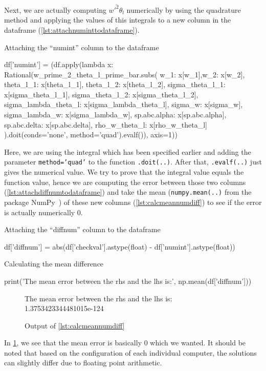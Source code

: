 Next, we are actually computing $\overline{w'^2\theta_l}$ numerically by using the quadrature method
and applying the values of this integrals
to a new column in the dataframe (\cref{lst:attachnuminttodataframe}).
\begin{listing}[!ht]
    \caption{Attaching the \enquote{numint} column to the dataframe}
    \label{lst:attachnuminttodataframe}
    \begin{pythoncode}
        df['numint'] = (df.apply(lambda x: Rational(w_prime_2_theta_l_prime_bar.subs({
            w_1: x[w_1],w_2: x[w_2], theta_l_1: x[theta_l_1], theta_l_2: x[theta_l_2],
            sigma_theta_l_1: x[sigma_theta_l_1], sigma_theta_l_2: x[sigma_theta_l_2],
            sigma_lambda_theta_l: x[sigma_lambda_theta_l], sigma_w: x[sigma_w],
            sigma_lambda_w: x[sigma_lambda_w], sp.abc.alpha: x[sp.abc.alpha],
            sp.abc.delta: x[sp.abc.delta], rho_w_theta_l: x[rho_w_theta_l]
        }).doit(conds='none', method='quad').evalf()), axis=1))
    \end{pythoncode}
\end{listing}
Here, we are using the integral which has been specified earlier
and adding the parameter \texttt{method='quad'}
to the function \texttt{.doit(..)}.
After that, \texttt{.evalf(..)} just gives the numerical value.
We try to prove that the integral value equals the function value,
hence we are computing the error between those two columns (\cref{lst:attachdiffnumtodataframe})
and take the mean (\texttt{numpy.mean(..)} from the package NumPy~\autocite{harris2020array})
of these new columns (\cref{lst:calcmeannumdiff}) to see if the error is actually numerically 0.
\begin{listing}[!ht]
    \caption{Attaching the \enquote{diffnum} column to the dataframe}
    \label{lst:attachdiffnumtodataframe}
    \begin{pythoncode}
        df['diffnum'] = abs(df['checkval'].astype(float) - df['numint'].astype(float))
    \end{pythoncode}
\end{listing}
\begin{listing}[!ht]
    \caption{Calculating the mean difference}
    \label{lst:calcmeannumdiff}
    \begin{pythoncode}
        print('The mean error between the rhs and the lhs is:', np.mean(df['diffnum']))
    \end{pythoncode}
\end{listing}
\begin{figure}[!ht]
    \centering
    \caption{Output of \cref{lst:calcmeannumdiff}}
    \label{fig:calcmeannumdiffout}
    The mean error between the rhs and the lhs is: 1.3753423344481015e-124
\end{figure}

In \cref{fig:calcmeannumdiffout}, we see that the mean error is basically 0 which we wanted.
It should be noted that based on the configuration of each individual computer,
the solutions can slightly differ due to floating point arithmetic.